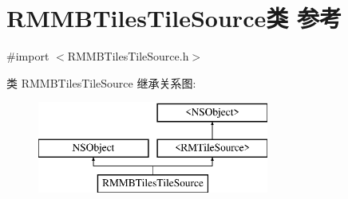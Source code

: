 \hypertarget{interface_r_m_m_b_tiles_tile_source}{\section{R\-M\-M\-B\-Tiles\-Tile\-Source类 参考}
\label{interface_r_m_m_b_tiles_tile_source}
}


{\ttfamily \#import $<$R\-M\-M\-B\-Tiles\-Tile\-Source.\-h$>$}

类 R\-M\-M\-B\-Tiles\-Tile\-Source 继承关系图\-:\begin{figure}[H]
\begin{center}
\leavevmode
\includegraphics[height=3.000000cm]{interface_r_m_m_b_tiles_tile_source}
\end{center}
\end{figure}
